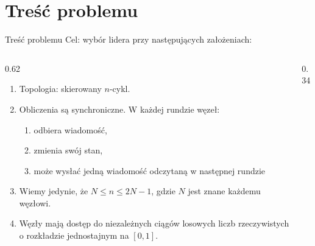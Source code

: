 \section{Treść problemu}

\begin{frame}{Treść problemu}
  Cel: wybór lidera przy następujących założeniach:
      \pause
    \begin{columns}[T,onlytextwidth]
    \begin{column}{0.62\textwidth}
      \begin{enumerate}[<+->]
        \item Topologia: skierowany $n$-cykl.
        \item Obliczenia są synchroniczne. W każdej rundzie węzeł:
          \begin{enumerate}[<+->]
            \item odbiera wiadomość,
            \item zmienia swój stan,
            \item może wysłać jedną wiadomość odczytaną w następnej rundzie
          \end{enumerate}
        \item Wiemy jedynie, że $N \leq n \leq 2N-1$, gdzie $N$ jest znane
          każdemu węzłowi.
        \item Węzły mają dostęp do niezależnych ciągów losowych liczb
          rzeczywistych o rozkładzie jednostajnym na $[0, 1]$.
      \end{enumerate}
    \end{column}

    \begin{column}{0.34\textwidth}
      \centering
    \end{column}
  \end{columns}
\end{frame}
